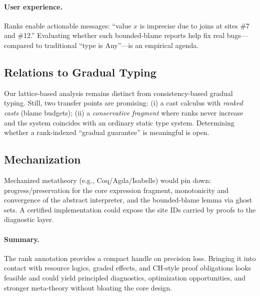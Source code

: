 \paragraph{User experience.}
Ranks enable actionable messages: ``value $x$ is imprecise due to joins at sites \#7 and \#12.''
Evaluating whether such bounded-blame reports help fix real bugs---compared to traditional ``type is Any''---is an empirical agenda.

\subsection{Relations to Gradual Typing}
Our lattice-based analysis remains distinct from consistency-based gradual typing.
Still, two transfer points are promising:
(i) a cast calculus with \emph{ranked casts} (blame budgets);
(ii) a \emph{conservative fragment} where ranks never increase and the system coincides with an ordinary static type system.
Determining whether a rank-indexed ``gradual guarantee'' is meaningful is open.

\subsection{Mechanization}
Mechanized metatheory (e.g., Coq/Agda/Isabelle) would pin down:
progress/preservation for the core expression fragment,
monotonicity and convergence of the abstract interpreter,
and the bounded-blame lemma via ghost sets.
A certified implementation could expose the site IDs carried by proofs to the diagnostic layer.

\paragraph{Summary.}
The rank annotation provides a compact handle on precision loss.
Bringing it into contact with resource logics, graded effects, and CH-style proof obligations looks feasible and could yield principled diagnostics, optimization opportunities, and stronger meta-theory without bloating the core design.
